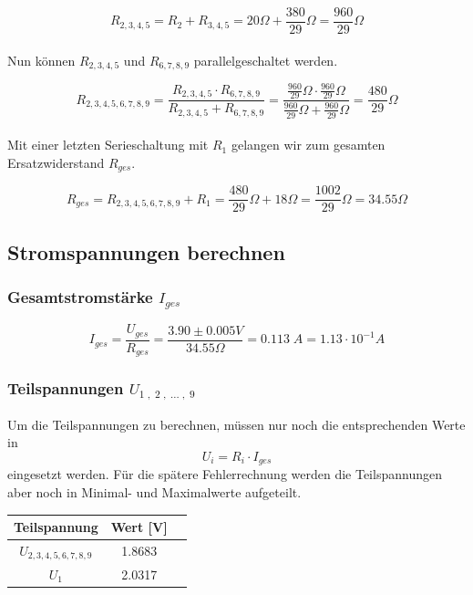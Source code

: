 \documentclass[a4paper,12pt]{article}
\begin{document}
$$R_{2,3,4,5} = R_2 + R_{3,4,5} = 20 \Omega + \frac{380}{29} \Omega = \frac{960}{29} \Omega$$\\

Nun können $R_{2,3,4,5}$ und $R_{6,7,8,9}$ parallelgeschaltet werden.

$$R_{2,3,4,5,6,7,8,9} = \frac{R_{2,3,4,5} \cdot R_{6,7,8,9}}{R_{2,3,4,5} + R_{6,7,8,9}} = \frac{\frac{960}{29}\Omega \cdot \frac{960}{29}\Omega}{\frac{960}{29}\Omega + \frac{960}{29}\Omega} = \frac{480}{29}\Omega$$\\

Mit einer letzten Serieschaltung mit $R_1$ gelangen wir zum gesamten Ersatzwiderstand $R_{ges}$.

$$R_{ges} = R_{2,3,4,5,6,7,8,9} + R_1 = \frac{480}{29}\Omega + 18\Omega = \frac{1002}{29}\Omega = 34.55\Omega$$

\newpage

\subsection{Stromspannungen berechnen}

\subsubsection{Gesamtstromstärke $I_{ges}$}

$$I_{ges} = \frac{U_{ges}}{R_{ges}} = \frac{3.90 \pm 0.005 V}{34.55\Omega} = 0.113 \;A = 1.13 \cdot 10^{-1} A$$

\subsubsection{Teilspannungen $U_{1\;,\;2\;,\; ...\;,\; 9}$}

Um die Teilspannungen zu berechnen, müssen nur noch die entsprechenden Werte in $$U_{i} = R_{i}\cdot I_{ges}$$ eingesetzt werden. Für die spätere Fehlerrechnung werden die Teilspannungen aber noch in Minimal- und Maximalwerte aufgeteilt.\\

\begin{table}[H]
    \centering
    \begin{tabular}{|c|c|c|}
        \hline
        \textbf{Teilspannung} & \textbf{Wert [V]}\\
        \hline
        $U_{2,3,4,5,6,7,8,9}$ & 1.8683\\
        \hline
        $U_{1}$ & 2.0317 \\
        \hline
    \end{tabular}
\end{table}
\end{document}
